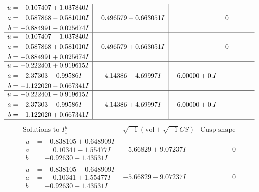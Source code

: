 \documentclass[1p]{elsarticle_modified}
\theoremstyle{definition}
\newcommand{\I}{\sqrt{-1}}
\begin{document}
$$\begin{array}{c|c|c}
\begin{aligned}
u &= \phantom{-}0.107407 + 1.037840 I \\
a &= \phantom{-}0.587868 - 0.581010 I \\
b &= -0.884991 - 0.025674 I\end{aligned}
 & \phantom{-}0.496579 - 0.663051 I & \phantom{-0.000000 } 0 \\ \hline\begin{aligned}
u &= \phantom{-}0.107407 - 1.037840 I \\
a &= \phantom{-}0.587868 + 0.581010 I \\
b &= -0.884991 + 0.025674 I\end{aligned}
 & \phantom{-}0.496579 + 0.663051 I & \phantom{-0.000000 } 0 \\ \hline\begin{aligned}
u &= -0.222401 + 0.919615 I \\
a &= \phantom{-}2.37303 + 0.99586 I \\
b &= -1.122020 - 0.667341 I\end{aligned}
 & -4.14386 - 4.69997 I & -6.00000 + 0. I\phantom{ +0.000000I} \\ \hline\begin{aligned}
u &= -0.222401 - 0.919615 I \\
a &= \phantom{-}2.37303 - 0.99586 I \\
b &= -1.122020 + 0.667341 I\end{aligned}
 & -4.14386 + 4.69997 I & -6.00000 + 0. I\phantom{ +0.000000I}\\
 \hline 
 \end{array}$$\newpage$$\begin{array}{c|c|c}  
\text{Solutions to }I^u_{1}& \I (\text{vol} + \sqrt{-1}CS) & \text{Cusp shape}\\
 \hline 
\begin{aligned}
u &= -0.838105 + 0.648909 I \\
a &= \phantom{-}0.10341 - 1.55477 I \\
b &= -0.92630 + 1.43531 I\end{aligned}
 & -5.66829 + 9.07237 I & \phantom{-0.000000 } 0 \\ \hline\begin{aligned}
u &= -0.838105 - 0.648909 I \\
a &= \phantom{-}0.10341 + 1.55477 I \\
b &= -0.92630 - 1.43531 I\end{aligned}
 & -5.66829 - 9.07237 I & \phantom{-0.000000 } 0 \\ \hline\begin{aligned}

\end{aligned}
\end{array}$$
\end{document}
